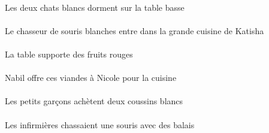 \begin{exe}
\DEFDuAbsP{}   \blancDDuP{}   \chatDDuAbsP{}    \DEFSgOblP{}   \basCSgP{}   \tableCSgOblP{}   \SURP{}  \dormirViPrsDDuP{}\\
Les deux chats blancs dorment sur la table basse
\ex\gll
\DEFSgAbs{}    \INDPlObl{}   \blancAPl{}   \sourisAPlObl{}   \DE{}   \chasseurCSgAbs{}    \DEFSgObl{}    \INDSgObl{}   \KatishaASgObl{}   \DE{}   \grandCSg{}   \cuisineCSgObl{}   \DANS{}  \entrerViPrsCSg{}\\
\DEFSgAbsP{}    \INDPlOblP{}   \blancAPlP{}   \sourisAPlOblP{}   \DEP{}   \chasseurCSgAbsP{}    \DEFSgOblP{}    \INDSgOblP{}   \KatishaASgOblP{}   \DEP{}   \grandCSgP{}   \cuisineCSgOblP{}   \DANSP{}  \entrerViPrsCSgP{}\\
Le chasseur de souris blanches entre dans la grande cuisine de Katisha
\ex\gll
\DEFSgErg{}   \tableCSgErg{}   \INDPlAbs{}   \rougeBPl{}   \fruitBPlAbs{}  \supporterVtPrsBPl{}\\
\DEFSgErgP{}   \tableCSgErgP{}   \INDPlAbsP{}   \rougeBPlP{}   \fruitBPlAbsP{}  \supporterVtPrsBPlP{}\\
La table supporte des fruits rouges
\ex\gll
\DEFSgObl{}   \cuisineCSgObl{}   \POUR{}   \INDSgErg{}   \NabilBSgErg{}    \INDSgDat{}   \NicoleDSgDat{}   \DEMPlAbs{}   \viandeAPlAbs{}  \offrirVdPrsAPl{}\\
\DEFSgOblP{}   \cuisineCSgOblP{}   \POURP{}   \INDSgErgP{}   \NabilBSgErgP{}    \INDSgDatP{}   \NicoleDSgDatP{}   \DEMPlAbsP{}   \viandeAPlAbsP{}  \offrirVdPrsAPlP{}\\
Nabil offre ces viandes à Nicole pour la cuisine
\ex\gll
\DEFPlErg{}   \petitBPl{}   \garconBPlErg{}   \INDDuAbs{}   \blancADu{}   \coussinADuAbs{}  \acheterVtPrsADu{}\\
\DEFPlErgP{}   \petitBPlP{}   \garconBPlErgP{}   \INDDuAbsP{}   \blancADuP{}   \coussinADuAbsP{}  \acheterVtPrsADuP{}\\
Les petits garçons achètent deux coussins blancs
\ex\gll
\DEFPlErg{}   \infirmiereBPlErg{}    \INDPlObl{}   \balaiCPlObl{}   \AVEC{}   \INDSgAbs{}   \sourisASgAbs{}  \chasserVtPstASg{}\\
\DEFPlErgP{}   \infirmiereBPlErgP{}    \INDPlOblP{}   \balaiCPlOblP{}   \AVECP{}   \INDSgAbsP{}   \sourisASgAbsP{}  \chasserVtPstASgP{}\\
Les infirmières chassaient une souris avec des balais
\ex\gll
\DEMPlAbs{}   \autrucheDPlAbs{}    \DEFSgObl{}    \INDSgObl{}   \NabilBSgObl{}   \DE{}   \villageASgObl{}   \DANS{}  \arriverViPrsDPl{}\\
\DEMPlAbsP{}   \autrucheDPlAbsP{}    \DEFSgOblP{}    \INDSgOblP{}   \NabilBSgOblP{}   \DEP{}   \villageASgOblP{}   \DANSP{}  \arriverViPrsDPlP{}\\

\end{exe}
